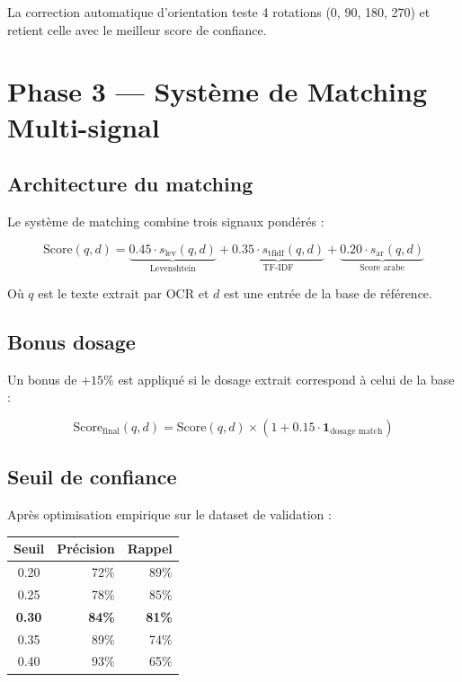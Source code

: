 \documentclass[12pt,a4paper]{report}
\begin{document}
La correction automatique d'orientation teste 4 rotations (0\textdegree{}, 90\textdegree{}, 180\textdegree{}, 270\textdegree{}) et retient celle avec le meilleur score de confiance.

\section{Phase 3 --- Syst\`eme de Matching Multi-signal}

\subsection{Architecture du matching}

Le syst\`eme de matching combine trois signaux pond\'er\'es :

\begin{equation}
\text{Score}(q, d) = \underbrace{0.45 \cdot s_{\text{lev}}(q, d)}_{\text{Levenshtein}} + \underbrace{0.35 \cdot s_{\text{tfidf}}(q, d)}_{\text{TF-IDF}} + \underbrace{0.20 \cdot s_{\text{ar}}(q, d)}_{\text{Score arabe}}
\end{equation}

O\`u $q$ est le texte extrait par OCR et $d$ est une entr\'ee de la base de r\'ef\'erence.

\subsection{Bonus dosage}

Un bonus de $+15\%$ est appliqu\'e si le dosage extrait correspond \`a celui de la base :

\begin{equation}
\text{Score}_{\text{final}}(q, d) = \text{Score}(q, d) \times (1 + 0.15 \cdot \mathbf{1}_{\text{dosage match}})
\end{equation}

\subsection{Seuil de confiance}

Apr\`es optimisation empirique sur le dataset de validation :

\begin{center}
\begin{tabular}{crr}
\toprule
\textbf{Seuil} & \textbf{Pr\'ecision} & \textbf{Rappel} \\
\midrule
0.20 & 72\% & 89\% \\
0.25 & 78\% & 85\% \\
\textbf{0.30} & \textbf{84\%} & \textbf{81\%} \\
0.35 & 89\% & 74\% \\
0.40 & 93\% & 65\% \\
\bottomrule
\end{tabular}
\end{center}
\end{document}
